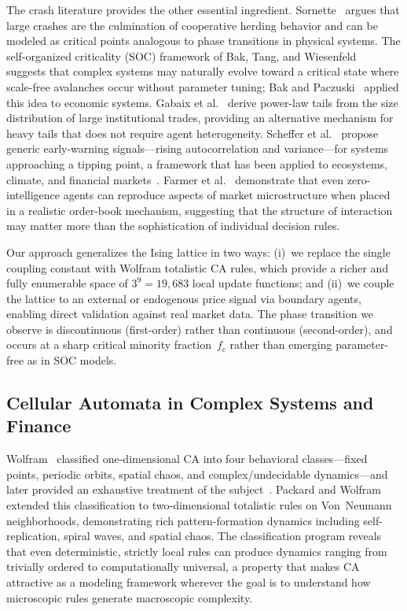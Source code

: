 \documentclass{article}
\theoremstyle{definition}
\theoremstyle{remark}
\begin{document}
The crash literature provides the other essential ingredient. Sornette~\cite{sornette2017why}
argues that large crashes are the culmination of cooperative herding behavior and can be
modeled as critical points analogous to phase transitions in physical systems. The
self-organized criticality (SOC) framework of Bak, Tang, and
Wiesenfeld~\cite{bak1987selforganized} suggests that complex systems may naturally evolve
toward a critical state where scale-free avalanches occur without parameter tuning; Bak and
Paczuski~\cite{bak1996complexity} applied this idea to economic systems. Gabaix et
al.~\cite{gabaix2003theory} derive power-law tails from the size distribution of large
institutional trades, providing an alternative mechanism for heavy tails that does not require
agent heterogeneity. Scheffer et al.~\cite{scheffer2009early} propose generic early-warning
signals---rising autocorrelation and variance---for systems approaching a tipping point, a
framework that has been applied to ecosystems, climate, and financial
markets~\cite{battiston2016complexity}. Farmer et al.~\cite{farmer2005predictive} demonstrate
that even zero-intelligence agents can reproduce aspects of market microstructure when placed
in a realistic order-book mechanism, suggesting that the structure of interaction may matter
more than the sophistication of individual decision rules.

Our approach generalizes the Ising lattice in two ways: (i)~we replace the single coupling
constant with Wolfram totalistic CA rules, which provide a richer and fully enumerable space
of $3^9 = 19{,}683$ local update functions; and (ii)~we couple the lattice to an external
or endogenous price signal via boundary agents, enabling direct validation against real market
data. The phase transition we observe is discontinuous (first-order) rather than continuous
(second-order), and occurs at a sharp critical minority fraction~$f_c$ rather than emerging
parameter-free as in SOC models.

\subsection{Cellular Automata in Complex Systems and Finance}
Wolfram~\cite{wolfram1984universality} classified one-dimensional CA into four behavioral
classes---fixed points, periodic orbits, spatial chaos, and complex/undecidable
dynamics---and later provided an exhaustive treatment of the
subject~\cite{wolfram2002new}. Packard and Wolfram~\cite{packard1985two} extended this
classification to two-dimensional totalistic rules on Von~Neumann neighborhoods,
demonstrating rich pattern-formation dynamics including self-replication, spiral waves,
and spatial chaos. The classification program reveals that even deterministic,
strictly local rules can produce dynamics ranging from trivially ordered to computationally
universal, a property that makes CA attractive as a modeling framework wherever the goal
is to understand how microscopic rules generate macroscopic complexity.
\end{document}
